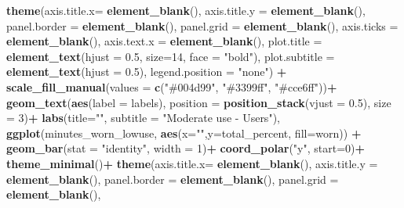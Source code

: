 \documentclass[
]{article}
\newenvironment{Shaded}{\begin{snugshade}}{\end{snugshade}}
\newcommand{\AttributeTok}[1]{\textcolor[rgb]{0.13,0.29,0.53}{#1}}
\newcommand{\DecValTok}[1]{\textcolor[rgb]{0.00,0.00,0.81}{#1}}
\newcommand{\FloatTok}[1]{\textcolor[rgb]{0.00,0.00,0.81}{#1}}
\newcommand{\FunctionTok}[1]{\textcolor[rgb]{0.13,0.29,0.53}{\textbf{#1}}}
\newcommand{\NormalTok}[1]{#1}
\newcommand{\SpecialCharTok}[1]{\textcolor[rgb]{0.81,0.36,0.00}{\textbf{#1}}}
\newcommand{\StringTok}[1]{\textcolor[rgb]{0.31,0.60,0.02}{#1}}
\begin{document}
\begin{Shaded}
\begin{Highlighting}[]
  \FunctionTok{theme}\NormalTok{(}\AttributeTok{axis.title.x=} \FunctionTok{element\_blank}\NormalTok{(),}
        \AttributeTok{axis.title.y =} \FunctionTok{element\_blank}\NormalTok{(),}
        \AttributeTok{panel.border =} \FunctionTok{element\_blank}\NormalTok{(), }
        \AttributeTok{panel.grid =} \FunctionTok{element\_blank}\NormalTok{(), }
        \AttributeTok{axis.ticks =} \FunctionTok{element\_blank}\NormalTok{(),}
        \AttributeTok{axis.text.x =} \FunctionTok{element\_blank}\NormalTok{(),}
        \AttributeTok{plot.title =} \FunctionTok{element\_text}\NormalTok{(}\AttributeTok{hjust =} \FloatTok{0.5}\NormalTok{, }\AttributeTok{size=}\DecValTok{14}\NormalTok{, }\AttributeTok{face =} \StringTok{"bold"}\NormalTok{), }
        \AttributeTok{plot.subtitle =} \FunctionTok{element\_text}\NormalTok{(}\AttributeTok{hjust =} \FloatTok{0.5}\NormalTok{),}
        \AttributeTok{legend.position =} \StringTok{"none"}\NormalTok{) }\SpecialCharTok{+}
    \FunctionTok{scale\_fill\_manual}\NormalTok{(}\AttributeTok{values =} \FunctionTok{c}\NormalTok{(}\StringTok{"\#004d99"}\NormalTok{, }\StringTok{"\#3399ff"}\NormalTok{, }\StringTok{"\#cce6ff"}\NormalTok{))}\SpecialCharTok{+}
  \FunctionTok{geom\_text}\NormalTok{(}\FunctionTok{aes}\NormalTok{(}\AttributeTok{label =}\NormalTok{ labels),}
            \AttributeTok{position =} \FunctionTok{position\_stack}\NormalTok{(}\AttributeTok{vjust =} \FloatTok{0.5}\NormalTok{), }\AttributeTok{size =} \DecValTok{3}\NormalTok{)}\SpecialCharTok{+}
  \FunctionTok{labs}\NormalTok{(}\AttributeTok{title=}\StringTok{""}\NormalTok{, }\AttributeTok{subtitle =} \StringTok{"Moderate use {-} Users"}\NormalTok{), }
  \FunctionTok{ggplot}\NormalTok{(minutes\_worn\_lowuse, }\FunctionTok{aes}\NormalTok{(}\AttributeTok{x=}\StringTok{""}\NormalTok{,}\AttributeTok{y=}\NormalTok{total\_percent, }\AttributeTok{fill=}\NormalTok{worn)) }\SpecialCharTok{+}
  \FunctionTok{geom\_bar}\NormalTok{(}\AttributeTok{stat =} \StringTok{"identity"}\NormalTok{, }\AttributeTok{width =} \DecValTok{1}\NormalTok{)}\SpecialCharTok{+}
  \FunctionTok{coord\_polar}\NormalTok{(}\StringTok{"y"}\NormalTok{, }\AttributeTok{start=}\DecValTok{0}\NormalTok{)}\SpecialCharTok{+}
  \FunctionTok{theme\_minimal}\NormalTok{()}\SpecialCharTok{+}
  \FunctionTok{theme}\NormalTok{(}\AttributeTok{axis.title.x=} \FunctionTok{element\_blank}\NormalTok{(),}
        \AttributeTok{axis.title.y =} \FunctionTok{element\_blank}\NormalTok{(),}
        \AttributeTok{panel.border =} \FunctionTok{element\_blank}\NormalTok{(), }
        \AttributeTok{panel.grid =} \FunctionTok{element\_blank}\NormalTok{(), }

\end{Highlighting}
\end{Shaded}
\end{document}
